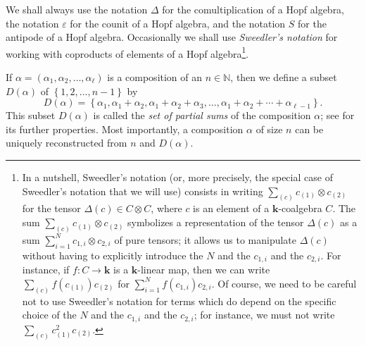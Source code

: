 \documentclass[numbers=enddot,12pt,final,onecolumn,notitlepage,abstracton]{scrartcl}%
\theoremstyle{definition}
\let\sumnonlimits\sum
\renewcommand{\sum}{\sumnonlimits\limits}
\begin{document}
We shall always use the notation $\Delta$ for the comultiplication of a Hopf
algebra, the notation $\varepsilon$ for the counit of a Hopf algebra, and the
notation $S$ for the antipode of a Hopf algebra. Occasionally we shall use
\textit{Sweedler's notation} for working with coproducts of elements of a Hopf
algebra\footnote{In a nutshell, Sweedler's notation (or, more precisely, the
special case of Sweedler's notation that we will use) consists in writing
$\sum_{\left(  c\right)  }c_{\left(  1\right)  }\otimes c_{\left(  2\right)
}$ for the tensor $\Delta\left(  c\right)  \in C\otimes C$, where $c$ is an
element of a $\mathbf{k}$-coalgebra $C$. The sum $\sum_{\left(  c\right)
}c_{\left(  1\right)  }\otimes c_{\left(  2\right)  }$ symbolizes a
representation of the tensor $\Delta\left(  c\right)  $ as a sum $\sum
_{i=1}^{N}c_{1,i}\otimes c_{2,i}$ of pure tensors; it allows us to manipulate
$\Delta\left(  c\right)  $ without having to explicitly introduce the $N$ and
the $c_{1,i}$ and the $c_{2,i}$. For instance, if $f:C\rightarrow\mathbf{k}$
is a $\mathbf{k}$-linear map, then we can write $\sum_{\left(  c\right)
}f\left(  c_{\left(  1\right)  }\right)  c_{\left(  2\right)  }$ for
$\sum_{i=1}^{N}f\left(  c_{1,i}\right)  c_{2,i}$. Of course, we need to be
careful not to use Sweedler's notation for terms which do depend on the
specific choice of the $N$ and the $c_{1,i}$ and the $c_{2,i}$; for instance,
we must not write $\sum_{\left(  c\right)  }c_{\left(  1\right)  }%
^{2}c_{\left(  2\right)  }$.}.

If $\alpha=\left(  \alpha_{1},\alpha_{2},\ldots,\alpha_{\ell}\right)  $ is a
composition of an $n\in\mathbb{N}$, then we define a subset $D\left(
\alpha\right)  $ of $\left\{  1,2,\ldots,n-1\right\}  $ by%
\[
D\left(  \alpha\right)  =\left\{  \alpha_{1},\alpha_{1}+\alpha_{2},\alpha
_{1}+\alpha_{2}+\alpha_{3},\ldots,\alpha_{1}+\alpha_{2}+\cdots+\alpha_{\ell
-1}\right\}  .
\]
This subset $D\left(  \alpha\right)  $ is called the \textit{set of partial
sums} of the composition $\alpha$; see \cite[Definition 5.1.10]{Reiner} for
its further properties. Most importantly, a composition $\alpha$ of size $n$
can be uniquely reconstructed from $n$ and $D\left(  \alpha\right)  $.
\end{document}
